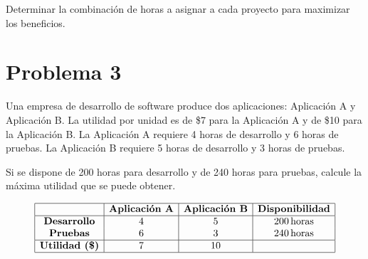 \documentclass{article}
\begin{document}
Determinar la combinación de horas a asignar a cada proyecto para maximizar los beneficios.

\section{Problema 3}

Una empresa de desarrollo de software produce dos aplicaciones: Aplicación A y Aplicación B. La utilidad por unidad es de \$7 para la Aplicación A y de \$10 para la Aplicación B. La Aplicación A requiere 4 horas de desarrollo y 6 horas de pruebas. La Aplicación B requiere 5 horas de desarrollo y 3 horas de pruebas.

Si se dispone de 200 horas para desarrollo y de 240 horas para pruebas, calcule la máxima utilidad que se puede obtener.

\[
\begin{array}{|c|c|c|c|}
\hline
 & \textbf{Aplicación A} & \textbf{Aplicación B} & \textbf{Disponibilidad} \\
\hline
\textbf{Desarrollo} & 4 & 5 & 200 \, \text{horas} \\
\textbf{Pruebas} & 6 & 3 & 240 \, \text{horas} \\
\hline
\textbf{Utilidad (\$)} & 7 & 10 & \\
\hline
\end{array}
\]
\end{document}
